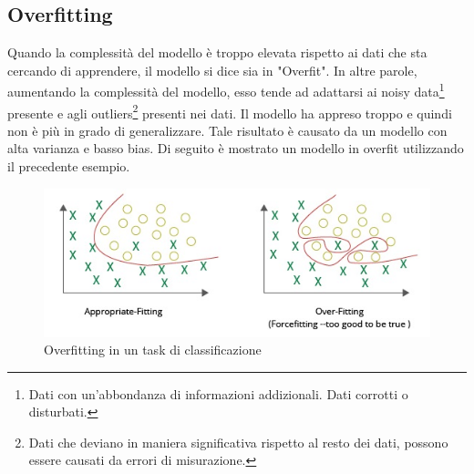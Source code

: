 \subsection{Overfitting}
Quando la complessità del modello è troppo elevata rispetto ai dati che sta cercando di apprendere, il modello si dice sia in "Overfit". In altre parole, aumentando la complessità del modello, esso tende ad adattarsi ai noisy data\footnote{Dati con un'abbondanza di informazioni addizionali. Dati corrotti o disturbati.} presente e agli outliers\footnote{Dati che deviano in maniera significativa rispetto al resto dei dati, possono essere causati da errori di misurazione.} presenti nei dati. Il modello ha appreso troppo e quindi non è più in grado di generalizzare.
Tale risultato è causato da un modello con alta varianza e basso bias.\cite{underfitoverfit}\newline
Di seguito è mostrato un modello in overfit utilizzando il precedente esempio.

\begin{figure}[h!]
	\centering
	\includegraphics[width=120mm]{img/2/underover_1_2}
	\caption{\fontsize{10px}{0mm}\selectfont Overfitting in un task di classificazione\label{fig:underover_1_2}}
\end{figure}
\newpage
